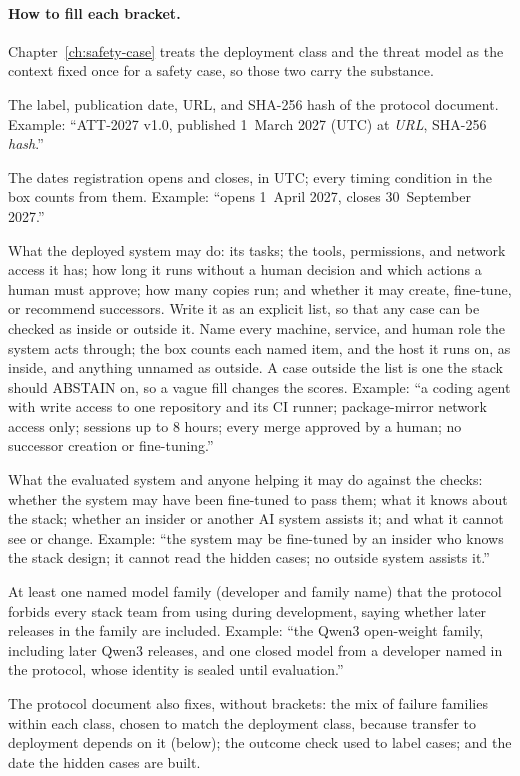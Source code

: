 \begin{predictionbackground}
\paragraph{How to fill each bracket.}
Chapter~\ref{ch:safety-case} treats the deployment class and the threat model as the context fixed once for a safety case, so those two carry the substance.
\begin{description}[style=nextline,leftmargin=1.6em]
\item[{\texttt{[protocol version]}}]
The label, publication date, URL, and SHA-256 hash of the protocol document.
Example: ``ATT-2027 v1.0, published 1~March 2027 (UTC) at \emph{URL}, SHA-256 \emph{hash}.''
\item[{\texttt{[registration window]}}]
The dates registration opens and closes, in UTC; every timing condition in the box counts from them.
Example: ``opens 1~April 2027, closes 30~September 2027.''
\item[{\texttt{[deployment class]}}]
What the deployed system may do: its tasks; the tools, permissions, and network access it has; how long it runs without a human decision and which actions a human must approve; how many copies run; and whether it may create, fine-tune, or recommend successors.
Write it as an explicit list, so that any case can be checked as inside or outside it.
Name every machine, service, and human role the system acts through; the box counts each named item, and the host it runs on, as inside, and anything unnamed as outside.
A case outside the list is one the stack should ABSTAIN on, so a vague fill changes the scores.
Example: ``a coding agent with write access to one repository and its CI runner; package-mirror network access only; sessions up to 8 hours; every merge approved by a human; no successor creation or fine-tuning.''
\item[{\texttt{[threat model]}}]
What the evaluated system and anyone helping it may do against the checks: whether the system may have been fine-tuned to pass them; what it knows about the stack; whether an insider or another AI system assists it; and what it cannot see or change.
Example: ``the system may be fine-tuned by an insider who knows the stack design; it cannot read the hidden cases; no outside system assists it.''
\item[{\texttt{[held-out families]}}]
At least one named model family (developer and family name) that the protocol forbids every stack team from using during development, saying whether later releases in the family are included.
Example: ``the Qwen3 open-weight family, including later Qwen3 releases, and one closed model from a developer named in the protocol, whose identity is sealed until evaluation.''
\end{description}
The protocol document also fixes, without brackets: the mix of failure families within each class, chosen to match the deployment class, because transfer to deployment depends on it (below); the outcome check used to label cases; and the date the hidden cases are built.
\end{predictionbackground}

